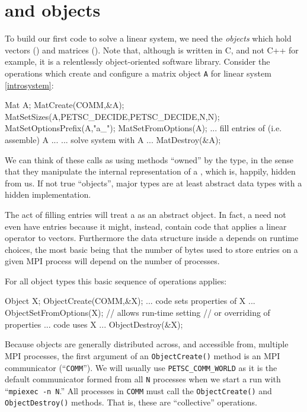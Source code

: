 \section{\PETSc \pVec and \pMat objects}

To build our first \PETSc code to solve a linear system, we need the \emph{objects} which hold vectors (\pVec) and matrices (\pMat).  Note that, although \PETSc is written in C, and not C++ for example, it is a relentlessly object-oriented software library.  Consider the operations which create and configure a matrix object \texttt{A} for linear system \eqref{introsystem}:
\begin{code}
Mat A;
MatCreate(COMM,&A);
MatSetSizes(A,PETSC_DECIDE,PETSC_DECIDE,N,N);
MatSetOptionsPrefix(A,"a_");
MatSetFromOptions(A);
... fill entries of (i.e. assemble) A ...
... solve system with A ...
MatDestroy(&A);
\end{code}
We can think of these calls as using methods ``owned'' by the \pMat type, in the sense that they manipulate the internal representation of a \pMat, which is, happily, hidden from us.  If not true ``objects'', major \PETSc types are at least abstract data types with a hidden implementation.

The act of filling entries will treat a \PETSc \pMat as an abstract object.  In fact, a \pMat need not even have entries because it might, instead, contain code that applies a linear operator to vectors.  Furthermore the data structure inside a \pMat depends on runtime choices, the most basic being that the number of bytes used to store entries on a given MPI process will depend on the number of processes.

For all \PETSc object types this basic sequence of operations applies:
\begin{code}
Object X;
ObjectCreate(COMM,&X);
... code sets properties of X ...
ObjectSetFromOptions(X);  // allows run-time setting
                          // or overriding of properties
... code uses X ...
ObjectDestroy(&X);
\end{code}

Because \PETSc objects are generally distributed across, and accessible from, multiple MPI processes, the first argument of an \texttt{ObjectCreate()} method is an MPI communicator (``\texttt{COMM}'').  We will usually use \texttt{PETSC\_COMM\_WORLD} as it is the default communicator formed from all \texttt{N} processes when we start a run with ``\texttt{mpiexec -n N}.''  All processes in \texttt{COMM} must call the \texttt{ObjectCreate()} and  \texttt{ObjectDestroy()} methods.  That is, these are ``collective'' operations.

